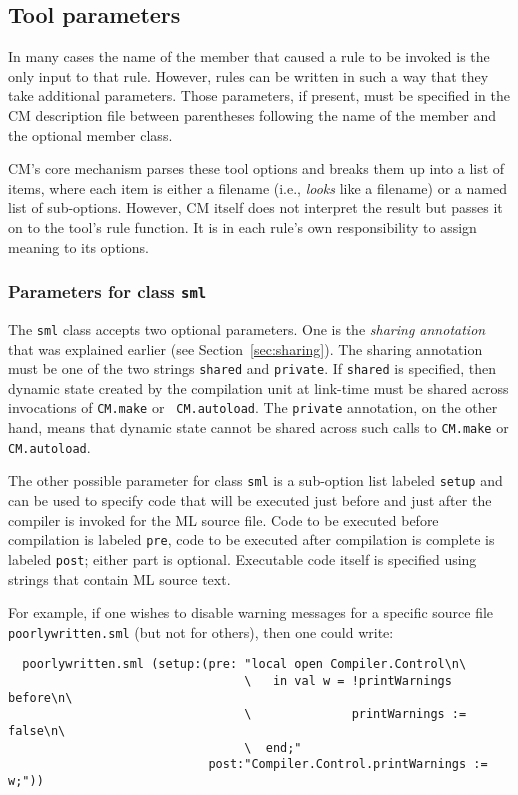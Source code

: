 \documentclass[titlepage,letterpaper]{article}
\begin{document}
\subsection{Tool parameters}
\label{sec:toolparam}

In many cases the name of the member that caused a rule to be invoked
is the only input to that rule.  However, rules can be written in such
a way that they take additional parameters.  Those parameters, if
present, must be specified in the CM description file between
parentheses following the name of the member and the optional member
class.

CM's core mechanism parses these tool options and breaks them up into
a list of items, where each item is either a filename (i.e., {\em
looks} like a filename) or a named list of sub-options.  However, CM
itself does not interpret the result but passes it on to the tool's
rule function.  It is in each rule's own responsibility to assign
meaning to its options.

\subsubsection{Parameters for class {\tt sml}}

The {\tt sml} class accepts two optional parameters.  One is the {\em
sharing annotation} that was explained earlier (see
Section~\ref{sec:sharing}).  The sharing annotation must be one of the
two strings {\tt shared} and {\tt private}.  If {\tt shared} is
specified, then dynamic state created by the compilation unit at
link-time must be shared across invocations of {\tt CM.make} or {\tt
CM.autoload}.  The {\tt private} annotation, on the other hand, means
that dynamic state cannot be shared across such calls to {\tt CM.make}
or {\tt CM.autoload}.

The other possible parameter for class {\tt sml} is a sub-option
list labeled {\tt setup} and can be used to specify code that will be
executed just before and just after the compiler is invoked for the
ML source file.  Code to be executed before compilation is labeled
{\tt pre}, code to be executed after compilation is complete is
labeled {\tt post}; either part is optional.  Executable code itself
is specified using strings that contain ML source text.

For example, if one wishes to disable warning messages for a specific
source file {\tt poorlywritten.sml} (but not for others), then one
could write:

\begin{verbatim}
  poorlywritten.sml (setup:(pre: "local open Compiler.Control\n\
                                 \   in val w = !printWarnings before\n\
                                 \              printWarnings := false\n\
                                 \  end;"
                            post:"Compiler.Control.printWarnings := w;"))
\end{verbatim}
\end{document}
